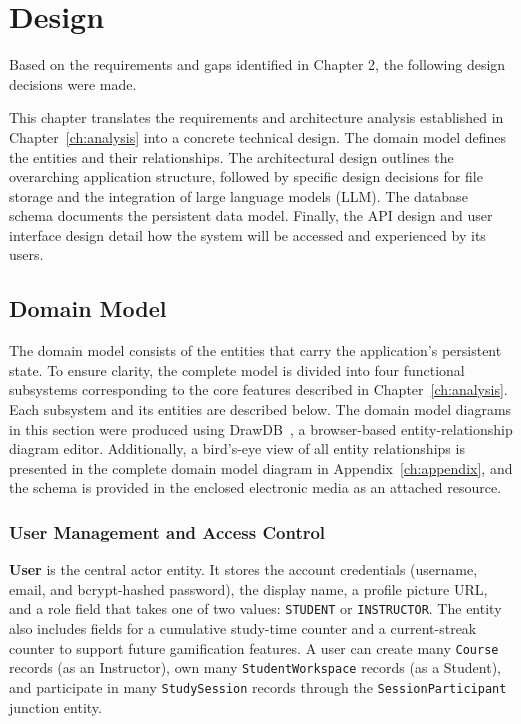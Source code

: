 \chapter{Design}
\label{ch:design}

Based on the requirements and gaps identified in Chapter 2, the following design decisions were made.

This chapter translates the requirements and architecture analysis established in
Chapter~\ref{ch:analysis} into a concrete technical design. The domain model defines the
entities and their relationships. The architectural design outlines the overarching
application structure, followed by specific design decisions for file storage and the integration
of large language models (LLM). The database schema documents the
persistent data model. Finally, the API design and user interface design detail how the system
will be accessed and experienced by its users.

\section{Domain Model}
\label{sec:domain-model}

The domain model consists of the entities that carry the application's persistent state. To ensure clarity, the complete model is divided into four functional subsystems corresponding to the core features described in Chapter~\ref{ch:analysis}. Each subsystem and its entities are described below. The domain model diagrams in this section were produced using DrawDB~\cite{DrawDB}, a browser-based entity-relationship diagram editor. Additionally, a bird's-eye view of all entity relationships is presented in the complete domain model diagram in Appendix~\ref{ch:appendix}, and the schema is provided in the enclosed electronic media as an attached resource.

\subsection{User Management and Access Control}
\label{subsec:domain-user}

\textbf{User} is the central actor entity. It stores the account credentials (username, email,
and bcrypt-hashed password), the display name, a profile picture URL, and a role field that
takes one of two values: \texttt{STUDENT} or \texttt{INSTRUCTOR}. The entity also includes
fields for a cumulative study-time counter and a current-streak counter to support future
gamification features. A user can create many \texttt{Course} records (as an Instructor), own many
\texttt{StudentWorkspace} records (as a Student), and participate in many \texttt{StudySession}
records through the \texttt{SessionParticipant} junction entity.

